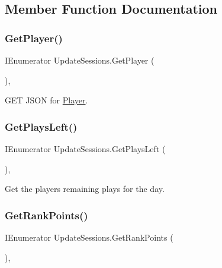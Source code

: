 \subsection{Member Function Documentation}
\mbox{\label{class_update_sessions_a2a73c7d01b39317eab0b06a3ddfb9669}} 
\subsubsection{\texorpdfstring{GetPlayer()}{GetPlayer()}}
{\footnotesize\ttfamily I\+Enumerator Update\+Sessions.\+Get\+Player (\begin{DoxyParamCaption}{ }\end{DoxyParamCaption})\hspace{0.3cm}{\ttfamily [inline]}, {\ttfamily [private]}}



G\+ET J\+S\+ON for \mbox{\hyperlink{class_player}{Player}}. 

\mbox{\label{class_update_sessions_a9e3f91b8c328a2c75b4fd7ba38ea5c1a}} 
\subsubsection{\texorpdfstring{GetPlaysLeft()}{GetPlaysLeft()}}
{\footnotesize\ttfamily I\+Enumerator Update\+Sessions.\+Get\+Plays\+Left (\begin{DoxyParamCaption}{ }\end{DoxyParamCaption})\hspace{0.3cm}{\ttfamily [inline]}, {\ttfamily [private]}}



Get the player\textquotesingle{}s remaining plays for the day. 

\mbox{\label{class_update_sessions_afe2dacd8d53c15803cca09bf07de37b7}} 
\subsubsection{\texorpdfstring{GetRankPoints()}{GetRankPoints()}}
{\footnotesize\ttfamily I\+Enumerator Update\+Sessions.\+Get\+Rank\+Points (\begin{DoxyParamCaption}{ }\end{DoxyParamCaption})\hspace{0.3cm}{\ttfamily [inline]}, {\ttfamily [private]}}



